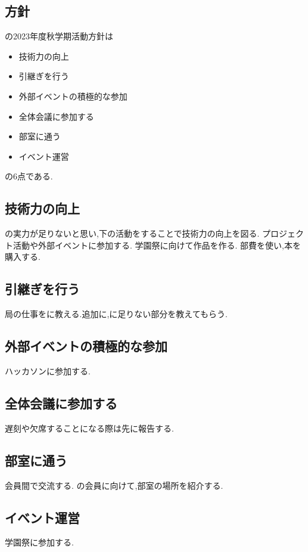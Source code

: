 \subsection*{\newGradeIfKouki{}\secondGrade{}方針}


\secondGrade{}の2023年度秋学期活動方針は
\begin{itemize}
    \item 技術力の向上
    \item 引継ぎを行う
    \item 外部イベントの積極的な参加
    \item 全体会議に参加する
    \item 部室に通う
    \item イベント運営
\end{itemize}
の6点である.

\subsection*{技術力の向上}
\secondGrade{}の実力が足りないと思い,下の活動をすることで技術力の向上を図る.
プロジェクト活動や外部イベントに参加する.
学園祭に向けて作品を作る.
部費を使い,本を購入する.

\subsection*{引継ぎを行う}
局の仕事を\firstGrade{}に教える.追加に,\thirdGrade{}に足りない部分を教えてもらう.

\subsection*{外部イベントの積極的な参加}
ハッカソンに参加する.

\subsection*{全体会議に参加する}
遅刻や欠席することになる際は先に報告する.

\subsection*{部室に通う}
会員間で交流する.
\firstGrade{}の会員に向けて,部室の場所を紹介する.

\subsection*{イベント運営}
学園祭に参加する.

